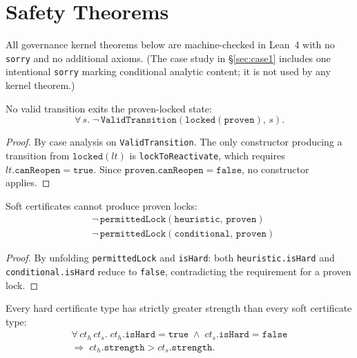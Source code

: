 \documentclass[runningheads]{llncs}
\begin{document}
\section{Safety Theorems}
\label{sec:theorems}

All governance kernel theorems below are machine-checked in Lean~4
with no \texttt{sorry} and no additional axioms. (The case study in
\S\ref{sec:case1} includes one intentional \texttt{sorry} marking
conditional analytic content; it is not used by any kernel theorem.)

\begin{theorem}
\label{thm:permanent}
No valid transition exits the proven-locked state:
\[
\forall\, s.\; \neg\, \texttt{ValidTransition}(\texttt{locked}(\texttt{proven}),\, s).
\]
\end{theorem}

\begin{proof}
By case analysis on \texttt{ValidTransition}. The only constructor producing a
transition from $\texttt{locked}(lt)$ is \texttt{lockToReactivate}, which
requires $lt.\texttt{canReopen} = \texttt{true}$. Since
$\texttt{proven}.\texttt{canReopen} = \texttt{false}$, no constructor applies.
\end{proof}

\begin{theorem}
\label{thm:nopremature}
Soft certificates cannot produce proven locks:
\begin{align*}
  &\neg\, \texttt{permittedLock}(\texttt{heuristic},\, \texttt{proven}) \\
  &\neg\, \texttt{permittedLock}(\texttt{conditional},\, \texttt{proven})
\end{align*}
\end{theorem}

\begin{proof}
By unfolding \texttt{permittedLock} and \texttt{isHard}:
both \texttt{heuristic.isHard} and \texttt{conditional.isHard}
reduce to \texttt{false}, contradicting the requirement for a
proven lock.
\end{proof}

\begin{theorem}
\label{thm:gap}
Every hard certificate type has strictly greater strength than every soft
certificate type:
\begin{multline*}
\forall\, ct_h\, ct_s.\;
  ct_h.\texttt{isHard} = \texttt{true} \;\land\;
  ct_s.\texttt{isHard} = \texttt{false} \\
  \Longrightarrow\;
  ct_h.\texttt{strength} > ct_s.\texttt{strength}.
\end{multline*}
\end{theorem}
\end{document}
